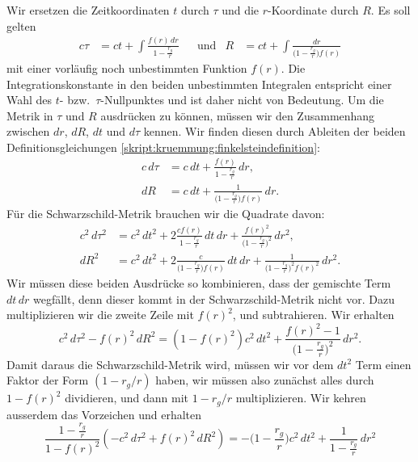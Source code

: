 Wir ersetzen die Zeitkoordinaten $t$ durch $\tau$ und die $r$-Koordinate
durch $R$.
Es soll gelten
\begin{equation}
\begin{aligned}
c\tau
&=
ct + \int\frac{f(r)\,dr}{\displaystyle 1-\frac{r_g}{r}}
&
&\text{und}
&
R
&=
ct
+
\int\frac{dr}{\displaystyle \biggl(1-\frac{r_g}{r}\biggr)f(r)}
\end{aligned}
\label{skript:kruemmung:finkelsteindefinition}
\end{equation}
mit einer vorläufig noch unbestimmten Funktion $f(r)$.
Die Integrationskonstante in den beiden unbestimmten Integralen
entspricht einer Wahl des $t$- bzw.~$\tau$-Nullpunktes und ist
daher nicht von Bedeutung.
Um die Metrik in $\tau$ und $R$ ausdrücken zu können, müssen wir 
den Zusammenhang zwischen $dr$, $dR$, $dt$ und $d\tau$ kennen.
Wir finden diesen durch Ableiten der beiden Definitionsgleichungen
\eqref{skript:kruemmung:finkelsteindefinition}:
\begin{align*}
c\,d\tau
&=
c\,dt + \frac{f(r)}{\displaystyle 1-\frac{r_g}{r}}\,dr,
\\
dR
&=
c\,dt
+
\frac{1}{\displaystyle\biggl(1-\frac{r_g}{r}\biggr)f(r)}\,dr.
\end{align*}
Für die Schwarzschild-Metrik brauchen wir die Quadrate davon:
\begin{align*}
c^2\,d\tau ^2
&=
c^2\,dt^2 + 2\frac{cf(r)}{\displaystyle 1-\frac{r_g}{r}}\,dt\,dr
+\frac{f(r)^2}{\biggl(\displaystyle 1-\frac{r_g}{r}\biggr)^2}\,dr^2,
\\
dR^2
&=
c^2\,dt^2 + 2\frac{c}{\displaystyle\biggl(1-\frac{r_g}{r}\biggr)f(r)}\,dt\,dr
+
\frac{1}{\displaystyle \biggl(1-\frac{r_g}{r}\biggr)^2f(r)^2}\,dr^2.
\end{align*}
Wir müssen diese beiden Ausdrücke so kombinieren, dass der gemischte
Term $dt\,dr$ wegfällt, denn dieser kommt in der Schwarzschild-Metrik
nicht vor.
Dazu multiplizieren wir die zweite Zeile mit $f(r)^2$, und subtrahieren.
Wir erhalten
\begin{equation}
c^2\,d\tau^2 - f(r)^2\,dR^2
=
(1-f(r)^2)c^2\,dt^2
+\frac{f(r)^2-1}{\displaystyle\biggl(1-\frac{r_g}{r}\biggr)^2}\,dr^2.
\end{equation}
Damit daraus die Schwarzschild-Metrik wird, müssen wir vor dem $dt^2$
Term einen Faktor der Form $(1-r_g/r)$ haben, wir müssen also zunächst
alles durch $1-f(r)^2$ dividieren, und dann mit $1-r_g/r$ multiplizieren.
Wir kehren ausserdem das Vorzeichen und erhalten
\[
\frac{\displaystyle 1-\frac{r_g}{r}}{1-f(r)^2}
(-c^2\,d\tau^2 + f(r)^2\,dR^2)
=
-\biggl(1-\frac{r_g}{r}\biggr)c^2\,dt^2
+\frac{1}{\displaystyle 1-\frac{r_g}{r}}\,dr^2
\]
